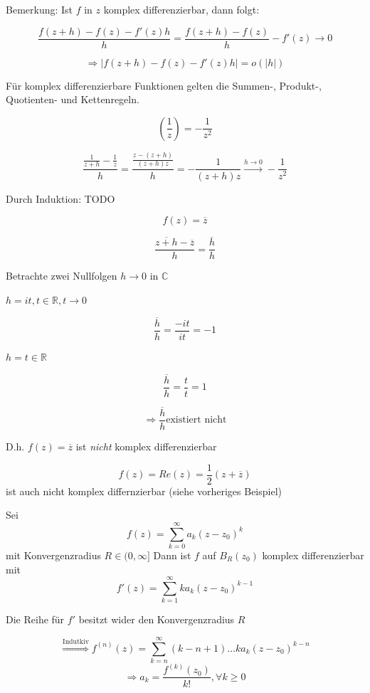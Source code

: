 \documentclass[10pt,a4paper]{article}
\begin{document}
Bemerkung: Ist $f$ in $z$ komplex differenzierbar, dann folgt:

$$\frac{f(z+h)-f(z)-f'(z)h}{h}=\frac{f(z+h)-f(z)}{h}-f'(z) \rightarrow 0$$

$$\Rightarrow |f(z+h)-f(z)-f'(z)h|=o(|h|)$$


\begin{satz}
Für komplex differenzierbare Funktionen gelten die Summen-, Produkt-, Quotienten- und Kettenregeln.
\end{satz}


\begin{bsp}[Zeige $\left( \frac{1}{z} \right)' = -\frac{1}{z^{2}}$]

$$\left( \frac{1}{z} \right) = -\frac{1}{z^{2}}$$

$$\frac{\frac{1}{z+h}-\frac{1}{z}}{h} = \frac{\frac{z-(z+h)}{(z+h)z}}{h}=-\frac{1}{(z+h)z} \stackrel{h \rightarrow 0}{\rightarrow} - \frac{1}{z^{2}}$$
\end{bsp}

\begin{bsp}[Zeige $(z^{n})'=n \cdot z^{n-1}$]
Durch Induktion:
TODO
\end{bsp}

\begin{bsp}[Komplexe Differenzierbarkeit von $f(z)=\overline{z}$]
$$f(z)=\overline{z}$$

$$\frac{\overline{z+h} - \overline{z}}{h} = \frac{\overline{h}}{h}$$

Betrachte zwei Nullfolgen $h\rightarrow 0$ in $\mathbb{C}$

$h=it, t \in \mathbb{R}, t\rightarrow 0$

$$\frac{\overline{h}}{h}=\frac{-it}{it}=-1$$

$h=t \in \mathbb{R}$

$$\frac{\overline{h}}{h} = \frac{t}{t} = 1$$

$$ \Rightarrow \frac{\overline{h}}{h} \text{existiert nicht}$$

D.h. $f(z)=\overline{z}$ ist \emph{nicht} komplex differenzierbar

\end{bsp}

\begin{bsp}[Komplexe Differenzierbarkeit von $f(z)=Re(z)$]
$$f(z)=Re(z)=\frac{1}{2}(z+\overline{z})$$ ist auch nicht komplex differnzierbar (siehe vorheriges Beispiel)
\end{bsp}


\begin{satz}

$$ $$
Sei $$f(z)=\sum_{k=0}^{\infty} a_k (z-z_0)^{k}$$ mit Konvergenzradius $R \in (0,\infty]$ Dann ist $f$ auf $B_R(z_0)$ komplex differenzierbar mit 
$$f'(z)=\sum_{k=1}^{\infty} k a_k (z-z_0)^{k-1}$$

Die Reihe für $f'$ besitzt wider den Konvergenzradius $R$

$$\stackrel{\text{Indutkiv}}{\Rightarrow} f^{(n)}(z)=\sum_{k=n}^{\infty} (k-n+1) \ldots  k a_k (z-z_0)^{k-n}$$ 
$$ \Rightarrow a_k =\frac{f^{(k)}(z_0)}{k!} , \forall k \geq 0$$
\end{satz}
\end{document}
